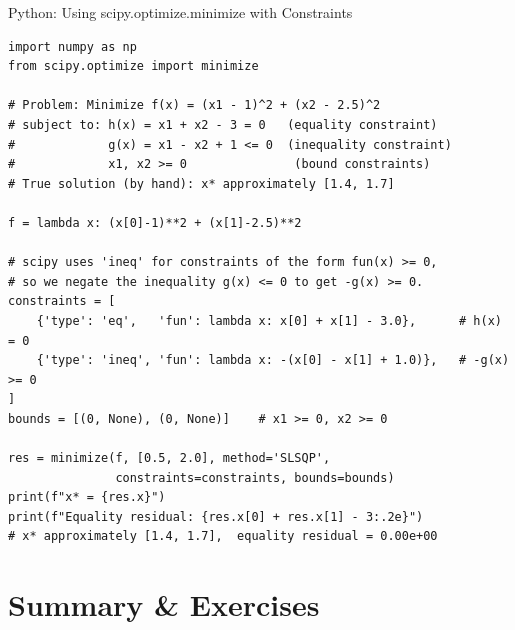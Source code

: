 \documentclass[aspectratio=169,10pt]{beamer}
\begin{document}
\begin{frame}[fragile]{Python: Using scipy.optimize.minimize with Constraints}
  \begin{lstlisting}[style=pycode,caption={scipy.optimize.minimize with equality and inequality constraints (SLSQP)}]
import numpy as np
from scipy.optimize import minimize

# Problem: Minimize f(x) = (x1 - 1)^2 + (x2 - 2.5)^2
# subject to: h(x) = x1 + x2 - 3 = 0   (equality constraint)
#             g(x) = x1 - x2 + 1 <= 0  (inequality constraint)
#             x1, x2 >= 0               (bound constraints)
# True solution (by hand): x* approximately [1.4, 1.7]

f = lambda x: (x[0]-1)**2 + (x[1]-2.5)**2

# scipy uses 'ineq' for constraints of the form fun(x) >= 0,
# so we negate the inequality g(x) <= 0 to get -g(x) >= 0.
constraints = [
    {'type': 'eq',   'fun': lambda x: x[0] + x[1] - 3.0},      # h(x) = 0
    {'type': 'ineq', 'fun': lambda x: -(x[0] - x[1] + 1.0)},   # -g(x) >= 0
]
bounds = [(0, None), (0, None)]    # x1 >= 0, x2 >= 0

res = minimize(f, [0.5, 2.0], method='SLSQP',
               constraints=constraints, bounds=bounds)
print(f"x* = {res.x}")
print(f"Equality residual: {res.x[0] + res.x[1] - 3:.2e}")
# x* approximately [1.4, 1.7],  equality residual = 0.00e+00
  \end{lstlisting}
\end{frame}

\section{Summary \& Exercises}
\end{document}
